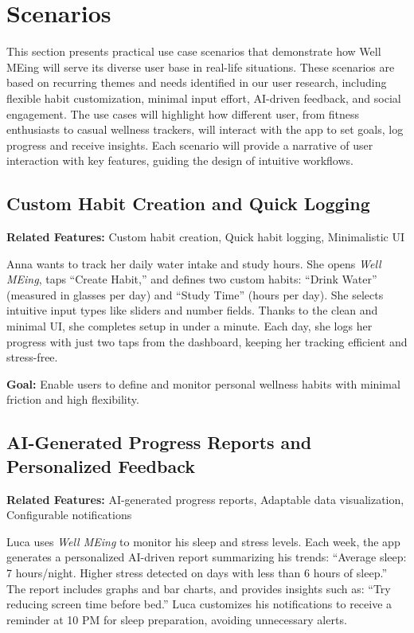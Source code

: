 \documentclass{article}
\begin{document}
\section{Scenarios}

This section presents practical use case scenarios that demonstrate how Well MEing will serve its diverse user base in real-life situations.
These scenarios are based on recurring themes and needs identified in our user research, including flexible habit customization, minimal input effort, AI-driven feedback, and social engagement.
The use cases will highlight how different user, from fitness enthusiasts to casual wellness trackers, will interact with the app to set goals, log progress and receive insights.
Each scenario will provide a narrative of user interaction with key features, guiding the design of intuitive workflows.

\subsection{Custom Habit Creation and Quick Logging}

\textbf{Related Features:} Custom habit creation, Quick habit logging, Minimalistic UI

\vspace{0.3cm}
\noindent
Anna wants to track her daily water intake and study hours. She opens \textit{Well MEing}, taps ``Create Habit,'' and defines two custom habits: ``Drink Water'' (measured in glasses per day) and ``Study Time'' (hours per day). She selects intuitive input types like sliders and number fields. Thanks to the clean and minimal UI, she completes setup in under a minute. Each day, she logs her progress with just two taps from the dashboard, keeping her tracking efficient and stress-free.

\vspace{0.2cm}
\noindent
\textbf{Goal:} Enable users to define and monitor personal wellness habits with minimal friction and high flexibility.

\subsection{AI-Generated Progress Reports and Personalized Feedback}

\textbf{Related Features:} AI-generated progress reports, Adaptable data visualization, Configurable notifications

\vspace{0.3cm}
\noindent
Luca uses \textit{Well MEing} to monitor his sleep and stress levels. Each week, the app generates a personalized AI-driven report summarizing his trends: ``Average sleep: 7 hours/night. Higher stress detected on days with less than 6 hours of sleep.'' The report includes graphs and bar charts, and provides insights such as: ``Try reducing screen time before bed.'' Luca customizes his notifications to receive a reminder at 10 PM for sleep preparation, avoiding unnecessary alerts.
\end{document}

